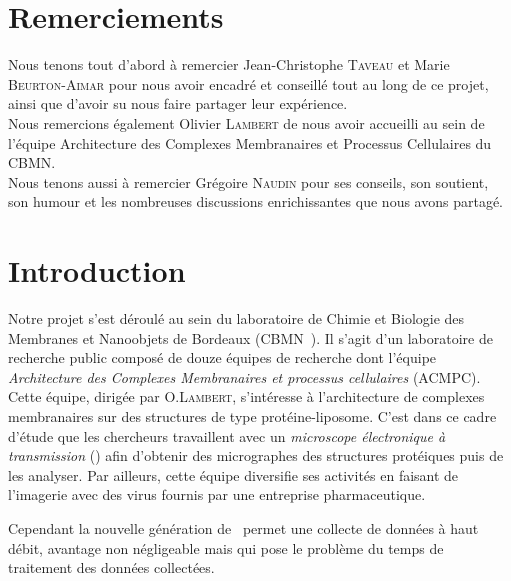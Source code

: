 \documentclass[12pt,a4paper]{report}
\begin{document}
\thispagestyle{empty}

\chapter*{Remerciements}

\thispagestyle{empty}

Nous tenons tout d'abord à remercier Jean-Christophe \textsc{Taveau} et Marie \textsc{Beurton-Aimar} pour nous avoir encadré et conseillé tout au long de ce projet, ainsi que d'avoir su nous faire partager leur expérience. \\

Nous remercions également Olivier \textsc{Lambert} de nous avoir accueilli au sein de l'équipe Architecture des Complexes Membranaires et Processus Cellulaires du CBMN. \\

Nous tenons aussi à remercier Grégoire \textsc{Naudin} pour ses conseils, son soutient, son humour et les nombreuses discussions enrichissantes que nous avons partagé.  

\thispagestyle{empty}

\tableofcontents

\thispagestyle{empty}


\chapter*{Introduction}

\setcounter{page}{5}

Notre projet s'est déroulé au sein du laboratoire de Chimie et Biologie des Membranes et Nanoobjets de Bordeaux (CBMN~\cite{cbmn:url}).
Il s'agit d'un laboratoire de recherche public composé de douze équipes de recherche dont l'équipe \emph{Architecture des Complexes Membranaires et processus cellulaires} (ACMPC). %
Cette équipe, dirigée par O.\textsc{Lambert}, s'intéresse à l'architecture de complexes membranaires sur des structures de type protéine-liposome. C'est dans ce cadre d'étude que les chercheurs travaillent avec un \emph{microscope électronique à transmission} (\me) afin d'obtenir des micrographes des structures protéiques puis de les analyser. Par ailleurs, cette équipe diversifie ses activités en faisant de l'imagerie avec des virus fournis par une entreprise pharmaceutique.

\noindent
Cependant la nouvelle génération de \me ~permet une collecte de données à haut débit, avantage non négligeable mais qui pose le problème du temps de traitement des données collectées. %
\end{document}
